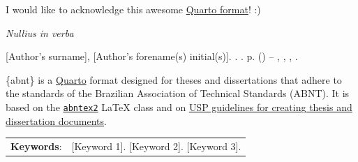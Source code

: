 \documentclass[
12pt,
openright,
oneside,
a4paper,
chapter=TITLE,
section=TITLE,
french,
spanish,
brazil,
english
]{abntex2}\usepackage{array}
\renewcommand{\agradecimentosname}{Acknowledgements}
\renewcommand{\epigraphname}{Epigraph}
\renewcommand{\resumoname}{Abstract}
\renewcommand{\agradecimentosname}{Agradecimentos}
\renewcommand{\epigraphname}{Epígrafe}
\renewcommand{\resumoname}{Resumo}
\renewcommand{\agradecimentosname}{Agradecimientos}
\renewcommand{\epigraphname}{Epígrafe}
\renewcommand{\resumoname}{Resumen}
\renewcommand{\epigraphname}{Épigraphe}
\renewcommand{\resumoname}{Résumé}
\providecommand{\imprimiruniversidade}{}
\providecommand{\imprimirescola}{}
\providecommand{\imprimirtituloacademico}{}
\newenvironment{resumoenv}[1][\resumoname]{
  \pretextualchapter{#1}
  \begingroup
  \setlength{\parindent}{0cm}
  \setlength{\parskip}{\smallskipamount} %
  \AtBeginEnvironment{tabular}{\normalsize}
  \renewcommand{\arraystretch}{1}
  \setlength{\aboverulesep}{0ex}
  \setlength{\belowrulesep}{0ex}
  \setlength{\arrayrulewidth}{0pt}
  \setlength{\tabcolsep}{0cm}
  \vspace{-\smallskipamount} %
  \begin{SingleSpace}
}{
  \end{SingleSpace}
  \cleardoublepage
  \endgroup
}
\theoremstyle{plain}
\theoremstyle{remark}
\begin{document}

\begin{agradecimentos}[\agradecimentosname]

I would like to acknowledge this awesome
\href{https://github.com/danielvartan/abnt}{Quarto format}! :)

\end{agradecimentos}


\begin{epigrafe}[] %
\vspace*{\fill} %
\begin{flushright}
\textit{Nullius in verba}\footnotemark{}

\end{flushright}
\end{epigrafe}


\begin{resumoenv}[\resumoname]
[Author's surname], [Author's forename(s) initial(s)]. \textbf{\imprimirtitulo}. {\imprimirdata}. {\thelastpage}p. {\imprimirtipotrabalho}  (\imprimirtituloacademico) -- {\imprimirescola}, {\imprimiruniversidade}, {\imprimirlocal}, {\imprimirdata}.


\{abnt\} is a \href{https://quarto.org}{Quarto} format designed for
theses and dissertations that adhere to the standards of the Brazilian
Association of Technical Standards (ABNT). It is based on the
\href{https://www.abntex.net.br/}{\texttt{abntex2}} LaTeX class and on
\href{https://teses.usp.br/index.php?option=com_content&view=article&id=52&Itemid=67&lang=en}{USP
guidelines for creating thesis and dissertation documents}.


\begin{tabular}{p{2.3cm} p{13.6cm}}
  \textbf{Keywords}: &  [Keyword 1]. [Keyword 2]. [Keyword 3].
\end{tabular}
\end{resumoenv}
\end{document}
